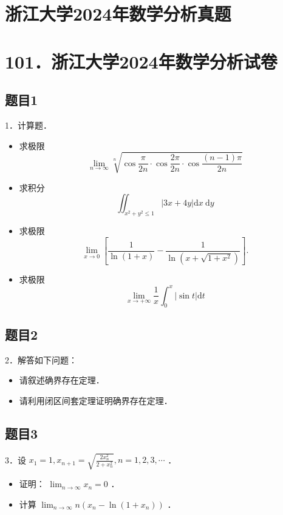 \documentclass{article}
\begin{document}
\section*{浙江大学2024年数学分析真题}
\section*{101．浙江大学2024年数学分析试卷}

\subsection{题目1}
1．计算题．

\begin{itemize}
  \item[（1）] 求极限
\[
\lim _{n \rightarrow \infty} \sqrt[n]{\cos \frac{\pi}{2 n} \cdot \cos \frac{2 \pi}{2 n} \cdot \cos \frac{(n-1) \pi}{2 n}}
\]
  \item[（2）] 求积分
\[
\iint_{x^{2}+y^{2} \leq 1}|3 x+4 y| \mathrm{d} x \mathrm{~d} y
\]
  \item[（3）] 求极限
\[
\lim _{x \rightarrow 0}\left[\frac{1}{\ln (1+x)}-\frac{1}{\ln \left(x+\sqrt{1+x^{2}}\right)}\right] .
\]
  \item[（4）] 求极限
\[
\lim _{x \rightarrow+\infty} \frac{1}{x} \int_{0}^{x}|\sin t| \mathrm{d} t
\]
\end{itemize}

\subsection{题目2}
2．解答如下问题：

\begin{itemize}
  \item[（1）] 请叙述确界存在定理．
  \item[（2）] 请利用闭区间套定理证明确界存在定理．
\end{itemize}

\subsection{题目3}
3．设 \(x_{1}=1, x_{n+1}=\sqrt{\frac{2 x_{n}^{2}}{2+x_{n}^{2}}}, n=1,2,3, \cdots\) ．

\begin{itemize}
  \item[（1）] 证明： \(\lim _{n \rightarrow \infty} x_{n}=0\) ．
  \item[（2）] 计算 \(\lim _{n \rightarrow \infty} n\left(x_{n}-\ln \left(1+x_{n}\right)\right)\) ．
\end{itemize}
\end{document}
